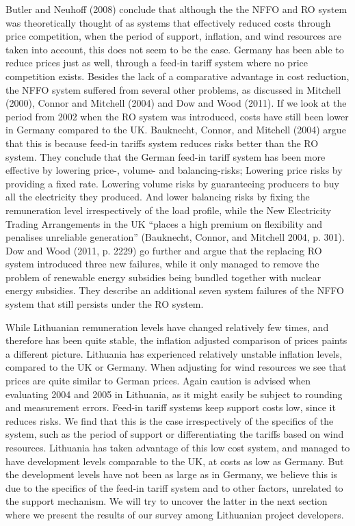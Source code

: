 \documentclass[a4paper, 12pt]{article}
\begin{document}
Butler and Neuhoff (2008) conclude that although the the NFFO and RO system was theoretically thought of as systems that effectively reduced costs through price competition, when the period of support, inflation, and wind resources are taken into account, this does not seem to be the case. Germany has been able to reduce prices just as well, through a feed-in tariff system where no price competition exists. Besides the lack of a comparative advantage in cost reduction, the NFFO system suffered from several other problems, as discussed in Mitchell (2000), Connor and Mitchell (2004) and Dow and Wood (2011). If we look at the period from 2002 when the RO system was introduced, costs have still been lower in Germany compared to the UK. Bauknecht, Connor, and Mitchell (2004) argue that this is because feed-in tariffs system reduces risks better than the RO system. They conclude that the German feed-in tariff system has been more effective by lowering price-, volume- and balancing-risks; Lowering price risks by providing a fixed rate. Lowering volume risks by guaranteeing producers to buy all the electricity they produced. And lower balancing risks by fixing the remuneration level irrespectively of the load profile, while the New Electricity Trading Arrangements in the UK ``places a high premium on flexibility and penalises unreliable generation'' (Bauknecht, Connor, and Mitchell 2004, p. 301). Dow and Wood (2011, p. 2229) go further and argue that the replacing RO system introduced three new failures, while it only managed to remove the problem of renewable energy subsidies being bundled together with nuclear energy subsidies. They describe an additional seven system failures of the NFFO system that still persists under the RO system.

While Lithuanian remuneration levels have changed relatively few times, and therefore  has been quite stable, the inflation adjusted comparison of prices paints a different picture. Lithuania has experienced relatively unstable inflation levels, compared to the UK or Germany. When adjusting for wind resources we see that prices are quite similar to German prices. Again caution is advised when evaluating 2004 and 2005 in Lithuania, as it might easily be subject to rounding and measurement errors. Feed-in tariff systems keep support costs low, since it reduces risks. We find that this is the case irrespectively of the specifics of the system, such as the period of support or differentiating the tariffs based on wind resources. Lithuania has taken advantage of this low cost system, and managed to have development levels comparable to the UK, at costs as low as Germany. But the development levels have not been as large as in Germany, we believe this is due to the specifics of the feed-in tariff system and to other factors, unrelated to the support mechanism. We will try to uncover the latter in the next section where we present the results of our survey among Lithuanian project developers.
\end{document}
